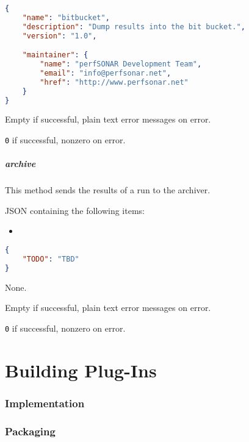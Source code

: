 \documentclass[10pt,titlepage]{article}
\begin{document}
\example
\begin{lstlisting}[language=json,firstnumber=1]
{
    "name": "bitbucket",
    "description": "Dump results into the bit bucket.",
    "version": "1.0",

    "maintainer": {
        "name": "perfSONAR Development Team",
        "email": "info@perfsonar.net",
        "href": "http://www.perfsonar.net"
    }
}
\end{lstlisting}

 Empty if successful, plain text error
messages on error.

 {\tt 0} if successful, nonzero on error.



\subsubsection{archive}

This method sends the results of a run to the archiver.

 JSON containing the following items:
\begin{itemize}
\item {}
\end{itemize}
\example
\begin{lstlisting}[language=json,firstnumber=1]
{
    "TODO": "TBD"
}
\end{lstlisting}

 None.

 Empty if successful, plain text error
messages on error.

 {\tt 0} if successful, nonzero on error.





\part{Building Plug-Ins}

\section{Implementation}

\section{Packaging}
\end{document}
